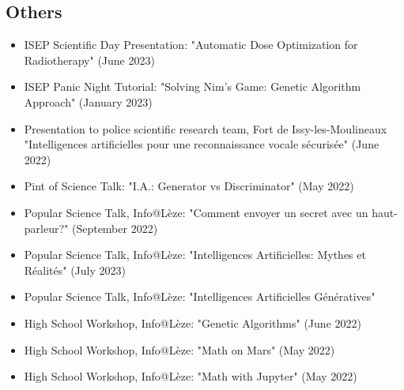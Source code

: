 \subsection*{Others}
\begin{itemize}
	\item ISEP Scientific Day Presentation: "Automatic Dose Optimization for Radiotherapy" (June 2023)
	\item ISEP Panic Night Tutorial: "Solving Nim's Game: Genetic Algorithm Approach" (January 2023)
	\item Presentation to police scientific research team, Fort de Issy-les-Moulineaux "Intelligences artificielles pour une reconnaissance vocale sécurisée" (June 2022)
	\item Pint of Science Talk: "I.A.: Generator vs Discriminator" (May 2022)
	\item Popular Science Talk, Info@Lèze: "Comment envoyer un secret avec un haut-parleur?" (September 2022)
	\item Popular Science Talk, Info@Lèze: "Intelligences Artificielles: Mythes et Réalités" (July 2023)
	\item Popular Science Talk, Info@Lèze: "Intelligences Artificielles Génératives"
	\item High School Workshop, Info@Lèze: "Genetic Algorithms" (June 2022)
	\item High School Workshop, Info@Lèze: "Math on Mars" (May 2022)
	\item High School Workshop, Info@Lèze: "Math with Jupyter" (May 2022)
\end{itemize}
